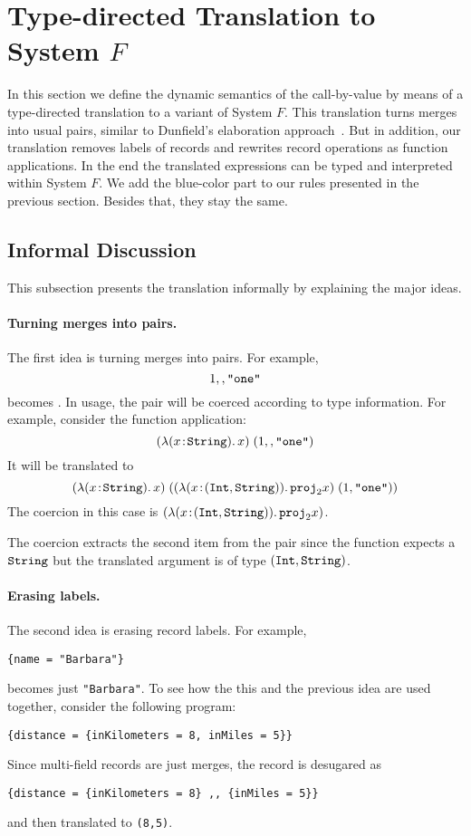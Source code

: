 \section{Type-directed Translation to System $ F $}

In this section we define the dynamic semantics of the call-by-value \name by
means of a type-directed translation to a variant of System $F$. This
translation turns merges into usual pairs, similar to Dunfield's elaboration
approach~\cite{dunfield2014elaborating}. But in addition, our translation
removes labels of records and rewrites record operations as function
applications. In the end the translated expressions can be typed and interpreted
within System $F$. We add the blue-color part to our rules presented in the
previous section. Besides that, they stay the same.

\subsection{Informal Discussion}

This subsection presents the translation informally by explaining the major
ideas. 

\paragraph{Turning merges into pairs.}
The first idea is turning merges into pairs. For example,
\[
1 ,, \texttt{"one"}
\]
becomes  {}.
In usage, the pair will be coerced according to type information. For example,
consider the function application:
\[
(\lambda (x \!:\! \texttt{String}).\, x) \; (1 ,, \texttt{"one"})
\]
It will be translated to
\[
(\lambda (x \!:\! \texttt{String}).\, x) \; ((\lambda (x \!:\! (\texttt{Int}, \texttt{String})).\, {\texttt{proj}}_{2} x) \; (1, \texttt{"one"}))
\]
The coercion in this case is $(\lambda (x \!:\! (\texttt{Int}, \texttt{String})).\, {\texttt{proj}}_{2} x)$.

\noindent The coercion extracts the second item from the pair since the function expects a $\texttt{String}$
but the translated argument is of type $(\texttt{Int}, \texttt{String})$. 

\paragraph{Erasing labels.}
The second idea is erasing record labels. For example,
\begin{lstlisting}
{name = "Barbara"}
\end{lstlisting}
becomes just \lstinline{"Barbara"}.
To see how the this and the previous idea are used together, consider the following program:
\begin{lstlisting}
{distance = {inKilometers = 8, inMiles = 5}}
\end{lstlisting}
Since multi-field records are just merges, the record is desugared as
\begin{lstlisting}
{distance = {inKilometers = 8} ,, {inMiles = 5}}
\end{lstlisting}
and then translated to \lstinline{(8,5)}.

